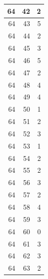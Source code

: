 \documentclass{article}
\begin{document}
\begin{multicols}{2}
{\begin{longtable}{|r|r|r|}
\hline 64 & 42 & 2 \\ 
\hline 64 & 43 & 5 \\ 
\hline 64 & 44 & 2 \\ 
\hline 64 & 45 & 3 \\ 
\hline 64 & 46 & 5 \\ 
\hline 64 & 47 & 2 \\ 
\hline 64 & 48 & 4 \\ 
\hline 64 & 49 & 4 \\ 
\hline 64 & 50 & 1 \\ 
\hline 64 & 51 & 2 \\ 
\hline 64 & 52 & 3 \\ 
\hline 64 & 53 & 1 \\ 
\hline 64 & 54 & 2 \\ 
\hline 64 & 55 & 2 \\ 
\hline 64 & 56 & 3 \\ 
\hline 64 & 57 & 2 \\ 
\hline 64 & 58 & 4 \\ 
\hline 64 & 59 & 3 \\ 
\hline 64 & 60 & 0 \\ 
\hline 64 & 61 & 3 \\ 
\hline 64 & 62 & 3 \\ 
\hline 64 & 63 & 2 \\ 
\hline

\end{longtable} 
\unskip
\unpenalty
\unpenalty}
\unvbox\ltmcbox

\end{multicols}
\restoregeometry
\end{document}

